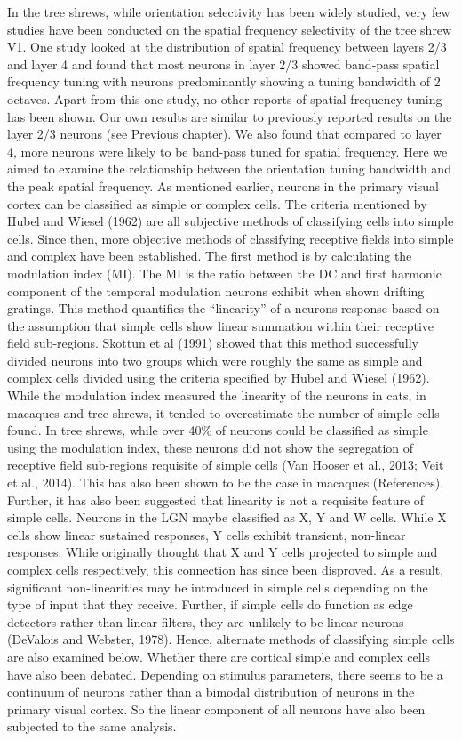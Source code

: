 	In the tree shrews, while orientation selectivity has been widely studied, very few studies have been conducted on the spatial frequency selectivity of the tree shrew V1. One study looked at the distribution of spatial frequency between layers 2/3 and layer 4 and found that most neurons in layer 2/3 showed band-pass spatial frequency tuning with neurons predominantly showing a tuning bandwidth of 2 octaves. Apart from this one study, no other reports of spatial frequency tuning has been shown. Our own results are similar to previously reported results on the layer 2/3 neurons (see Previous chapter). We also found that compared to layer 4, more neurons were likely to be band-pass tuned for spatial frequency. Here we aimed to examine the relationship between the orientation tuning bandwidth and the peak spatial frequency.
	As mentioned earlier, neurons in the primary visual cortex can be classified as simple or complex cells. The criteria mentioned by Hubel and Wiesel (1962) are all subjective methods of classifying cells into simple cells. Since then, more objective methods of classifying receptive fields into simple and complex have been established. The first method is by calculating the modulation index (MI). The MI is the ratio between the DC and first harmonic component of the temporal modulation neurons exhibit when shown drifting gratings. This method quantifies the “linearity” of a neurons response based on the assumption that simple cells show linear summation within their receptive field sub-regions. Skottun et al (1991) showed that this method successfully divided neurons into two groups which were roughly the same as simple and complex cells divided using the criteria specified by Hubel and Wiesel (1962).
	While the modulation index measured the linearity of the neurons in cats, in macaques and tree shrews, it tended to overestimate the number of simple cells found. In tree shrews, while over 40\% of neurons could be classified as simple using the modulation index, these neurons did not show the segregation of receptive field sub-regions requisite of simple cells (Van Hooser et al., 2013; Veit et al., 2014). This has also been shown to be the case in macaques (References). 
	Further, it has also been suggested that linearity is not a requisite feature of simple cells. Neurons in the LGN maybe classified as X, Y and W cells. While X cells show linear sustained responses, Y cells exhibit transient, non-linear responses. While originally thought that X and Y cells projected to simple and complex cells respectively, this connection has since been disproved. As a result, significant non-linearities may be introduced in simple cells depending on the type of input that they receive. Further, if simple cells do function as edge detectors rather than linear filters, they are unlikely to be linear neurons (DeValois and Webster, 1978). Hence, alternate methods of classifying simple cells are also examined below. 
	Whether there are cortical simple and complex cells have also been debated. Depending on stimulus parameters, there seems to be a continuum of neurons rather than a bimodal distribution of neurons in the primary visual cortex. So the linear component of all neurons have also been subjected to the same analysis.
	
